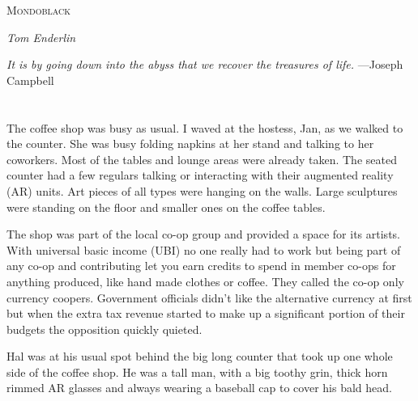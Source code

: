{}
\thispagestyle{empty}

\begin{titlepage}
  \vspace*{\fill}
  \begin{center}
  	{\scshape \Huge Mondoblack \par}
  	\vspace{1.5cm}
  	\par\vspace{1.5cm}
  	{\itshape \Large Tom Enderlin \par}
  \end{center}
  \vspace*{\fill}
\end{titlepage}

\thispagestyle{empty}
\vspace*{1cm}
\begin{center}
  \textit{It is by going down into the abyss that we recover the
treasures of life.}
      \flushright\footnotesize{---Joseph Campbell}
\end{center}
\newpage

\section{}
\thispagestyle{empty}
\setcounter{page}{1}

The coffee shop was busy as usual. I waved at the hostess, Jan, as
we walked to the counter. She was busy folding napkins at her
stand and talking to her coworkers. Most of the tables and
lounge areas were already taken. The seated counter had a few
regulars talking or interacting with their augmented reality
(AR) units. Art pieces of all types were hanging on the walls.
Large sculptures were standing on the floor and smaller ones on
the coffee tables.

The shop was part of the local co-op group and provided a space
for its artists. With universal basic income (UBI) no one really
had to work but being part of any co-op and contributing let you
earn credits to spend in member co-ops for anything produced,
like hand made clothes or coffee. They called the co-op only
currency coopers.  Government officials didn't like the
alternative currency at first but when the extra tax revenue
started to make up a significant portion of their budgets the
opposition quickly quieted.

Hal was at his usual spot behind the big long counter that took
up one whole side of the coffee shop.  He was a tall man, with a
big toothy grin, thick horn rimmed AR glasses and always wearing
a baseball cap to cover his bald head.


